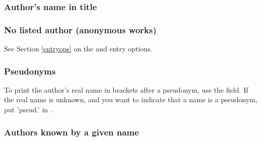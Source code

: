 \documentclass[11pt,letterpaper,oneside]{article}
\begin{document}
\subsubsection{Author's name in title}
\label{14.78}

\begin{citebib}
\item \cite*[233]{franklin1868}
\item \cite*[234]{franklin1868}
\end{citebib}

\subsubsection{No listed author (anonymous works)}
\label{14.79}

See Section \ref{entryops} on the  and 
entry options.

\begin{citebib}
\item \cite{anon1610}
\item \cite{anon1547}
\item \cite{horsley1796}
\item \cite{hawkes1834}
\end{citebib}

\subsubsection{Pseudonyms}

To print the author's real name in brackets after a pseudonym, use the
 field. If the real name is unknown, and you want
to indicate that a name is a pseudonym, put 'pseud.' in
.

\begin{citebib}
\item \cite{carre1982}
\item \cite{stendhal1925}
\end{citebib}

\setcounter{subsubsection}{82}
\subsubsection{Authors known by a given name}

\begin{citebib}
\item \cite{elizabeth2000}
\end{citebib}
\end{document}
